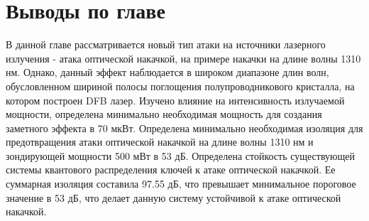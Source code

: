 \section{Выводы по главе}\label{sec:ch4/sect7}
В данной главе рассматривается новый тип атаки на источники лазерного излучения - атака оптической накачкой, на примере накачки на длине волны 1310 нм. Однако, данный эффект наблюдается в широком диапазоне длин волн, обусловленном шириной полосы поглощения полупроводникового кристалла, на котором построен DFB лазер. 
Изучено влияние на интенсивность излучаемой мощности, определена минимально необходимая мощность для создания заметного эффекта в 70 мкВт. Определена минимально необходимая изоляция для предотвращения атаки оптической накачкой на длине волны 1310 нм и зондирующей мощности 500 мВт в 53 дБ.
Определена стойкость существующей системы квантового распределения ключей к атаке оптической накачкой. Ее суммарная изоляция составила 97.55 дБ, что превышает минимальное пороговое значение в 53 дБ, что делает данную систему устойчивой к атаке оптической накачкой. 
